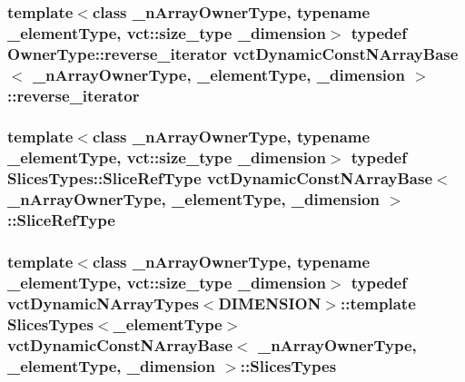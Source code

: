 \hypertarget{classvct_dynamic_const_n_array_base_a028c350d6f74e002681cce4239dfdbc1}{
\subsubsection[{reverse\-\_\-iterator}]{\setlength{\rightskip}{0pt plus 5cm}template$<$class \-\_\-n\-Array\-Owner\-Type, typename \-\_\-element\-Type, vct\-::size\-\_\-type \-\_\-dimension$>$ typedef Owner\-Type\-::reverse\-\_\-iterator {\bf vct\-Dynamic\-Const\-N\-Array\-Base}$<$ \-\_\-n\-Array\-Owner\-Type, \-\_\-element\-Type, \-\_\-dimension $>$\-::{\bf reverse\-\_\-iterator}}}\label{classvct_dynamic_const_n_array_base_a028c350d6f74e002681cce4239dfdbc1}
\hypertarget{classvct_dynamic_const_n_array_base_a4170184942c320b2402ba8dfdab9a915}{
\subsubsection[{Slice\-Ref\-Type}]{\setlength{\rightskip}{0pt plus 5cm}template$<$class \-\_\-n\-Array\-Owner\-Type, typename \-\_\-element\-Type, vct\-::size\-\_\-type \-\_\-dimension$>$ typedef Slices\-Types\-::\-Slice\-Ref\-Type {\bf vct\-Dynamic\-Const\-N\-Array\-Base}$<$ \-\_\-n\-Array\-Owner\-Type, \-\_\-element\-Type, \-\_\-dimension $>$\-::{\bf Slice\-Ref\-Type}}}\label{classvct_dynamic_const_n_array_base_a4170184942c320b2402ba8dfdab9a915}
\hypertarget{classvct_dynamic_const_n_array_base_a1f4ce8ed9fda0d5d1704f66799a55279}{
\subsubsection[{Slices\-Types}]{\setlength{\rightskip}{0pt plus 5cm}template$<$class \-\_\-n\-Array\-Owner\-Type, typename \-\_\-element\-Type, vct\-::size\-\_\-type \-\_\-dimension$>$ typedef {\bf vct\-Dynamic\-N\-Array\-Types}$<${\bf D\-I\-M\-E\-N\-S\-I\-O\-N}$>$\-::template {\bf Slices\-Types}$<$\-\_\-element\-Type$>$ {\bf vct\-Dynamic\-Const\-N\-Array\-Base}$<$ \-\_\-n\-Array\-Owner\-Type, \-\_\-element\-Type, \-\_\-dimension $>$\-::{\bf Slices\-Types}}}\label{classvct_dynamic_const_n_array_base_a1f4ce8ed9fda0d5d1704f66799a55279}
